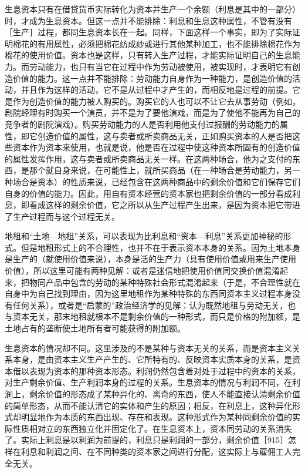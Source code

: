 生息资本只有在借贷货币实际转化为资本并生产一个余额（利息是其中的一部分）时，才成为生息资本。但这一点并不能排除：利息和生息这种属性，不管有没有［生产］过程，都同生息资本长在一起。同样，下面这样一个事实，即为了实际证明棉花的有用属性，必须把棉花纺成纱或进行其他某种加工，也不能排除棉花作为棉花的使用价值。资本也是这样，只有转入生产过程，才能实际证明自己的生息能力。而劳动能力，也只有当它在过程中作为劳动被使用，被实现时，才表明它有创造价值的能力。这一点并不能排除：劳动能力自身作为一种能力，是创造价值的活动，并且作为这样的活动，它不是从过程中才产生的，而相反地是过程的前提。它是作为创造价值的能力被人购买的。购买它的人也可以不让它去从事劳动（例如，剧院经理有时购买一个演员，并不是为了要他演戏，而是为了使他不能再为自己的竞争者的剧院演戏）。购买劳动能力的人是否利用他支付过报酬的劳动能力的属性，即它创造价值的属性，这与卖者或所卖商品无关，正如购买资本的人是否把这些资本作为资本来使用，也就是说，他是否在过程中使这种资本所固有的创造价值的属性发挥作用，这与卖者或所卖商品无关一样。在这两种场合，他为之支付的东西，是那个就自身来说，在可能性上，就所买商品（在一种场合是劳动能力，另一种场合是资本）的性质来说，已经包含在这两种商品中的剩余价值和它们保存它们自身的价值的能力。因此，用自有资本经营的资本家也把剩余价值的一部分看成利息，即看成这样的剩余价值，它之所以从生产过程产生出来，是因为资本把它带进了生产过程而与这个过程无关。

地租和“土地—地租”关系，可以表现为比利息和“资本—利息”关系更加神秘的形式。但是地租形式上的不合理性，也并不在于表示资本本身的关系。因为土地本身是生产的（就使用价值来说），本身是活的生产力（具有使用价值或用来生产使用价值），所以这里可能有两种见解：或者是迷信地把使用价值同交换价值混淆起来，把物同产品中包含的劳动的某种特殊社会形式混淆起来（于是，不合理性就在自身中为自己找到理由，因为这里地租作为某种特殊的东西同资本主义过程本身没有任何关系），或者是“启蒙的”政治经济学的见解：认为既然地租与劳动无关，也与资本无关，那末地租就根本不是剩余价值的一种形式，而只是价格的附加额，是土地占有的垄断使土地所有者可能获得的附加额。

生息资本的情况却不同。这里涉及的不是某种与资本无关的关系，而是资本主义关系本身，是由资本主义生产产生的、它所特有的、反映资本实质本身的关系，是资本借以表现为资本的那种资本形态。利润仍然包含着对处于过程中的资本的关系，对生产剩余价值、生产利润本身的过程的关系。生息资本的情况与利润不同，在利润上，剩余价值的形态成了某种异化的、离奇的东西，使人不能直接认清剩余价值的简单形态，从而不能认清它的实体和产生的原因；相反，在利息上，这种异化形式却明显地作为本质的东西出现、存在和表现。这种形式作为某种同剩余价值的实际性质相对立的东西独立化并固定化了。在生息资本上，资本同劳动的关系消失了。实际上利息是以利润为前提的，利息只是利润的一部分，剩余价值［915］怎样在利息和利润之间、在不同种类的资本家之间进行分配，这实际上与雇佣工人完全无关。

